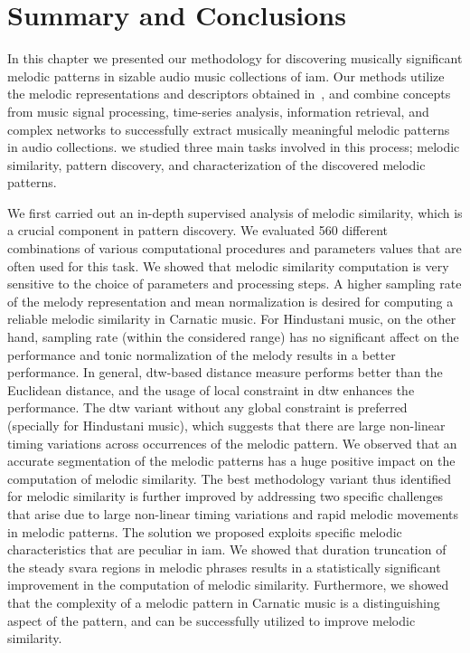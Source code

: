 {\section{Summary and Conclusions}
\label{sec:conclusions_patterns}

In this chapter we presented our methodology for discovering musically significant melodic patterns in sizable audio music collections of \gls{iam}. Our methods utilize the  melodic representations and descriptors obtained in~, and combine concepts from music signal processing, time-series analysis, information retrieval, and complex networks to successfully extract musically meaningful melodic patterns in audio collections. we studied three main tasks involved in this process; melodic similarity, pattern discovery, and characterization of the discovered melodic patterns. 

We first carried out an in-depth supervised analysis of melodic similarity, which is a crucial component in pattern discovery. We evaluated 560 different combinations of various computational procedures and parameters values that are often used for this task. We showed that melodic similarity computation is very sensitive to the choice of parameters and processing steps. A higher sampling rate of the melody representation and mean normalization is desired for computing a reliable melodic similarity in Carnatic music. For Hindustani music, on the other hand, sampling rate (within the considered range) has no significant affect on the performance and tonic normalization of the melody results in a better performance. In general, \gls{dtw}-based distance measure performs better than the Euclidean distance, and the usage of local constraint in \gls{dtw} enhances the performance. The \gls{dtw} variant without any global constraint is preferred (specially for Hindustani music), which suggests that there are large non-linear timing variations across occurrences of the melodic pattern. We observed that an accurate segmentation of the melodic patterns has a huge positive impact on the computation of melodic similarity. The best methodology variant thus identified for melodic similarity is further improved by addressing two specific challenges that arise due to large non-linear timing variations and rapid melodic movements in melodic patterns. The solution we proposed exploits specific melodic characteristics that are peculiar in \gls{iam}. We showed that duration truncation of the steady \gls{svara} regions in melodic phrases results in a statistically significant improvement in the computation of melodic similarity. Furthermore, we showed that the complexity of a melodic pattern in Carnatic music is a distinguishing aspect of the pattern, and can be successfully utilized to improve melodic similarity.

}
